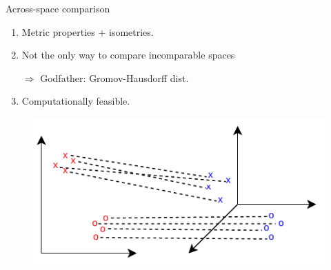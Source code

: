 \documentclass{beamer}
\begin{document}
\begin{frame}{Across-space comparison}
\vspace{-0.3cm}
\begin{minipage}[t]{0.5\linewidth}
\begin{enumerate}
  \item Metric properties + isometries.
  \item Not the only way to compare incomparable spaces

  $\Rightarrow$ Godfather: Gromov-Hausdorff dist.
  \item Computationally feasible.
\end{enumerate}
\end{minipage}%
\hfill%
\hspace{-6cm}
\begin{minipage}[t]{0.5\linewidth}
  \vspace{0.5cm}
\begin{figure}
  \centering
  \includegraphics[width=1.15\linewidth, keepaspectratio=true]{OT_new/gw.pdf}
\end{figure}
\end{minipage}

\end{frame}


\end{document}
